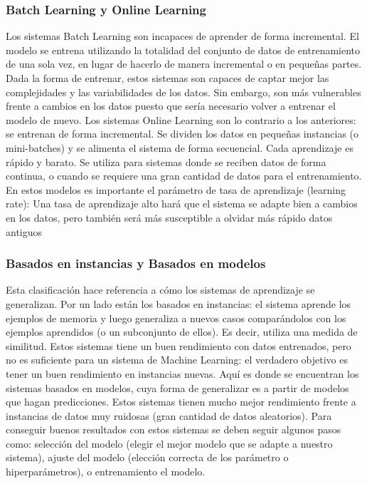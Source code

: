 \documentclass[12pt,a4paper,Spanish]{article}
\begin{document}
\subsubsection{Batch Learning y Online Learning}
Los sistemas Batch Learning son incapaces de aprender de forma incremental. El modelo se entrena utilizando la totalidad del conjunto de datos de entrenamiento de una sola vez, en lugar de hacerlo de manera incremental o en pequeñas partes. Dada la forma de entrenar, estos sistemas son capaces de captar mejor las complejidades y las variabilidades de los datos. Sin embargo, son más vulnerables frente a cambios en los datos puesto que sería necesario volver a entrenar el modelo de nuevo.
\newline
Los sistemas Online Learning son lo contrario a los anteriores: se entrenan de forma incremental. Se dividen los datos en pequeñas instancias (o mini-batches) y se alimenta el sistema de forma secuencial. Cada aprendizaje es rápido y barato. Se utiliza para sistemas donde se reciben datos de forma continua, o cuando se requiere una gran cantidad de datos para el entrenamiento. En estos modelos es importante el parámetro de tasa de aprendizaje (learning rate): Una tasa de aprendizaje alto hará que el sistema se adapte bien a cambios en los datos, pero también será más susceptible a olvidar más rápido datos antiguos


\subsubsection{Basados en instancias y Basados en modelos}
Esta clasificación hace referencia a cómo los sistemas de aprendizaje se generalizan. Por un lado están los basados en instancias: el sistema aprende los ejemplos de memoria y luego generaliza a nuevos casos comparándolos con los ejemplos aprendidos (o un subconjunto de
ellos). Es decir, utiliza una medida de similitud. Estos sistemas tiene un buen rendimiento con datos entrenados, pero no es suficiente para un sistema de Machine Learning: el verdadero objetivo es tener un buen rendimiento en instancias nuevas.
\newline
Aquí es donde se encuentran los sistemas basados en modelos, cuya forma de generalizar es a partir de modelos que hagan predicciones. Estos sistemas tienen mucho mejor rendimiento frente a instancias de datos muy ruidosas (gran cantidad de datos aleatorios). Para conseguir buenos resultados con estos sistemas se deben seguir algunos pasos como: selección del modelo (elegir el mejor modelo que se adapte a nuestro sistema), ajuste del modelo (elección correcta de los parámetro o hiperparámetros),  o entrenamiento el modelo.
\end{document}
